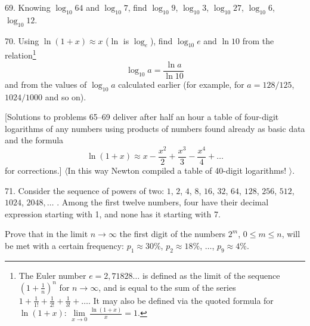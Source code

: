 \begin{problem}{69.}
	Knowing $\log_{10} 64$ and $\log_{10} 7$, find $\log_{10} 9$, $\log_{10} 3$,
    $\log_{10} 27$, $\log_{10} 6$, $\log_{10} 12$.
\end{problem}

\begin{problem}{70.}
	Using $\ln (1+x) \approx x$ ($\ln$ is $\log_e$), find $\log_{10} e$ and
    $\ln 10$ from the relation\footnote{The Euler number $e = 2{,}71828\dots$ is defined as the limit of the sequence
	$\left(1+\frac1n\right)^n$ for $n\to \infty$, and is equal to the sum of the series 
	$1+\frac 1{1!} +\frac 1{2!}+\frac 1{3!}+\dots$. It may also be defined via the quoted formula for 
	 $\ln (1+x)$: $\lim\limits_{x\to 0}\frac{\ln(1+x)}{x} = 1$. }\vspace{-\jot}
	$$
	\log_{10} a=\frac{\ln a}{\ln 10}
	$$ 
	and from the values of $\log_{10} a$ calculated earlier (for example, for $a=128/125$, $1024/1000$
	and so on).

	[Solutions to problems 65--69 deliver after half an hour a table of four-digit logarithms of any numbers using
	products of numbers found already as basic data and the formula  
	\vspace{-2\jot}
	\[
	\ln (1+x) \approx x-\frac{x^2}{2}+\frac{x^3}{3}-\frac{x^4}{4}+\dots
	\]
	for corrections.] $\langle$In this way Newton compiled a table of
	40-digit logarithms!%
	$\rangle$.
\end{problem}

\begin{problem}{71.}
	Consider the sequence of powers of two: $1$, $2$, $4$, $8$, $16$, $32$, $64$,
	$128$, $256$, $512$, $1024$, $2048, \dots$ . Among the first twelve numbers, four have their decimal expression
	starting with 1, and none has it starting with 7.

	Prove that in the limit $n \to \infty$ the first digit of the numbers $2^m$,
	$0\leqslant m \leqslant n$, will be met with a certain frequency:
	$p_1 \approx 30\%$, $p_2 \approx 18\%$,  $\dots$, $p_9 \approx 4\%$.
\end{problem}

